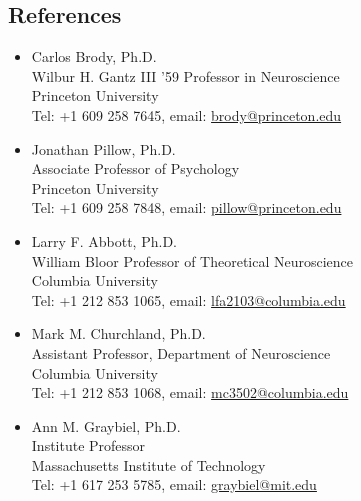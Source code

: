 \documentclass[margin, 10pt]{res}
\begin{document}
\begin{resume}
\begin{itemize}[label={}]
\section{\textnormal\bf{References}}

\begin{itemize}[label = {}]
\itemsep-0.5em 

\item Carlos Brody, Ph.D.\\
Wilbur H. Gantz III '59 Professor in Neuroscience\\
Princeton University\\
Tel: +1 609 258 7645, email: \href{mailto:brody@princeton.edu}{brody@princeton.edu}\\

\item Jonathan Pillow, Ph.D.\\
Associate Professor of Psychology\\
Princeton University\\
Tel: +1 609 258 7848, email: \href{mailto:pillow@princeton.edu}{pillow@princeton.edu}\\

\item Larry F. Abbott, Ph.D.\\
William Bloor Professor of Theoretical Neuroscience\\
Columbia University\\
Tel: +1 212 853 1065, email: \href{mailto:lfa2103@columbia.edu}{lfa2103@columbia.edu}\\

\item Mark M. Churchland, Ph.D.\\
Assistant Professor, Department of Neuroscience\\
Columbia University\\
Tel: +1 212 853 1068, email: \href{mailto:mc3502@columbia.edu}{mc3502@columbia.edu}\\

\item Ann M. Graybiel, Ph.D.\\
Institute Professor\\
Massachusetts Institute of Technology\\
Tel: +1 617 253 5785, email: \href{mailto:graybiel@mit.edu}{graybiel@mit.edu}\\

\end{itemize}

\end{itemize}


\end{resume}
\end{document}
